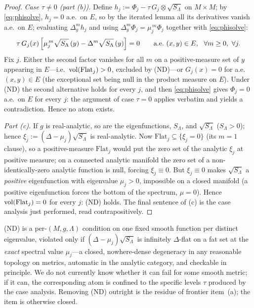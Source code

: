 \begin{proof}
\emph{Case $\tau\ne0$ (part (b)).}  Define
$h_j:=\Phi_j-\tau\,G_j\otimes\sqrt{S_\Lambda}$ on $M\times M$; by
\eqref{eq:phisolve}, $h_j=0$ a.e.\ on $E$, so by the iterated lemma all its
derivatives vanish a.e.\ on $E$; evaluating $\Delta_y^m h_j$ and using
$\Delta_y^m\Phi_j=\mu_j^{\,m}\Phi_j$ together with \eqref{eq:phisolve}:
\[
\tau\,G_j(x)\,\Bigl[\mu_j^{\,m}\sqrt{S_\Lambda}\,(y)
-\Delta^m\sqrt{S_\Lambda}\,(y)\Bigr]=0
\qquad\text{a.e.\ }(x,y)\in E,\ \ \forall m\ge0,\ \forall j .
\]
Fix $j$.  Either the second factor vanishes for all $m$ on a positive-measure
set of $y$ appearing in $E$---i.e.\ $\operatorname{vol}(\mathrm{Flat}_j)>0$, excluded by
\textup{(ND)}---or $G_j(x)=0$ for a.e.\ $(x,y)\in E$ (the exceptional set being
null in the product measure on $E$).  Under \textup{(ND)} the second alternative holds for
every $j$, and then \eqref{eq:phisolve} gives $\Phi_j=0$ a.e.\ on $E$ for every
$j$: the argument of case $\tau=0$ applies verbatim and yields a contradiction.
Hence no atom exists.

\emph{Part (c).}  If $g$ is real-analytic, so are the eigenfunctions,
$S_\Lambda$, and $\sqrt{S_\Lambda}$ ($S_\Lambda>0$); hence
$\xi_j:=(\Delta-\mu_j)\sqrt{S_\Lambda}$ is real-analytic.  Now
$\mathrm{Flat}_j\subseteq\{\xi_j=0\}$ (its $m{=}1$ clause), so a positive-measure
$\mathrm{Flat}_j$ would put the zero set of the analytic $\xi_j$ at positive
measure; on a connected analytic manifold the zero set of a
non-identically-zero analytic function is null, forcing $\xi_j\equiv0$.  But
$\xi_j\equiv0$ makes $\sqrt{S_\Lambda}$ a \emph{positive} eigenfunction with
eigenvalue $\mu_j>0$, impossible on a closed manifold (a positive eigenfunction
forces the bottom of the spectrum, $\mu=0$).  Hence $\operatorname{vol}(\mathrm{Flat}_j)=0$ for
every $j$: \textup{(ND)} holds.  The final sentence of (c) is the case analysis
just performed, read contrapositively.
\end{proof}

\begin{remark}\label{rem:nd}
(ND) is a per-$(M,g,\Lambda)$ condition on one fixed smooth function per
distinct eigenvalue, violated only if $(\Delta-\mu_j)\sqrt{S_\Lambda}$ is
infinitely $\Delta$-flat on a fat set at the \emph{exact} spectral value
$\mu_j$---a closed, nowhere-dense degeneracy in any reasonable topology on
metrics, automatic in the analytic category, and checkable in principle.  We do
not currently know whether it can fail for some smooth metric; if it can, the
corresponding atom is confined to the specific levels $\tau$ produced by the
case analysis.  Removing (ND) outright is the residue of frontier item~(a); the
item is otherwise closed.
\end{remark}

